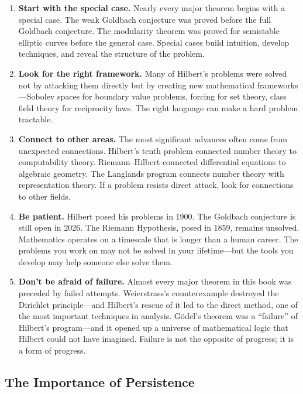 \begin{enumerate}
    \item \textbf{Start with the special case.} Nearly every major theorem begins with a special case. The weak Goldbach conjecture was proved before the full Goldbach conjecture. The modularity theorem was proved for semistable elliptic curves before the general case. Special cases build intuition, develop techniques, and reveal the structure of the problem.

    \item \textbf{Look for the right framework.} Many of Hilbert's problems were solved not by attacking them directly but by creating new mathematical frameworks---Sobolev spaces for boundary value problems, forcing for set theory, class field theory for reciprocity laws. The right language can make a hard problem tractable.

    \item \textbf{Connect to other areas.} The most significant advances often come from unexpected connections. Hilbert's tenth problem connected number theory to computability theory. Riemann--Hilbert connected differential equations to algebraic geometry. The Langlands program connects number theory with representation theory. If a problem resists direct attack, look for connections to other fields.

    \item \textbf{Be patient.} Hilbert posed his problems in 1900. The Goldbach conjecture is still open in 2026. The Riemann Hypothesis, posed in 1859, remains unsolved. Mathematics operates on a timescale that is longer than a human career. The problems you work on may not be solved in your lifetime---but the tools you develop may help someone else solve them.

    \item \textbf{Don't be afraid of failure.} Almost every major theorem in this book was preceded by failed attempts. Weierstrass's counterexample destroyed the Dirichlet principle---and Hilbert's rescue of it led to the direct method, one of the most important techniques in analysis. G\"odel's theorem was a ``failure'' of Hilbert's program---and it opened up a universe of mathematical logic that Hilbert could not have imagined. Failure is not the opposite of progress; it is a form of progress.
\end{enumerate}

\subsection{The Importance of Persistence}

